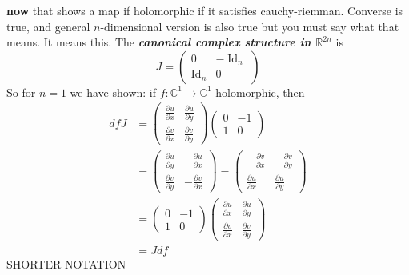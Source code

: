 \textbf{now} that shows a map if holomorphic if it satisfies cauchy-riemman. Converse is true, and general  \(n\)-dimensional version is also true but you must say what that means. It means this. The \textit{\textbf{canonical complex structure in \(\mathbb{R}^{2n}\)}} is
\[J=\begin{pmatrix} 0& -\operatorname{Id}_n\\ \operatorname{Id}_n&0\end{pmatrix} \]
So for \(n=1\) we have shown: if \(f: \mathbb{C}^1 \to \mathbb{C}^1\) holomorphic, then
\begin{align*}
df J&=\begin{pmatrix}\frac{\partial u}{\partial x}&\frac{\partial u}{\partial y}\\ \frac{\partial v}{\partial x}&\frac{\partial v}{\partial y}\end{pmatrix}\begin{pmatrix} 0& -1\\ 1&0\end{pmatrix}\\
&=\begin{pmatrix}\frac{\partial u}{\partial y}&-\frac{\partial u}{\partial x}\\ \frac{\partial v}{\partial y}&-\frac{\partial v}{\partial x}\end{pmatrix}=\begin{pmatrix}-\frac{\partial v}{\partial x}&-\frac{\partial v}{\partial y}\\ \frac{\partial u}{\partial x}&\frac{\partial u}{\partial y}\end{pmatrix}\\
&=\begin{pmatrix}0&-1\\ 1&0\end{pmatrix}\begin{pmatrix}\frac{\partial u}{\partial x}&\frac{\partial u}{\partial y}\\ \frac{\partial v}{\partial x}&\frac{\partial v}{\partial y}\end{pmatrix}\\
&=Jdf
\end{align*}
\iffalse SHORTER NOTATION
